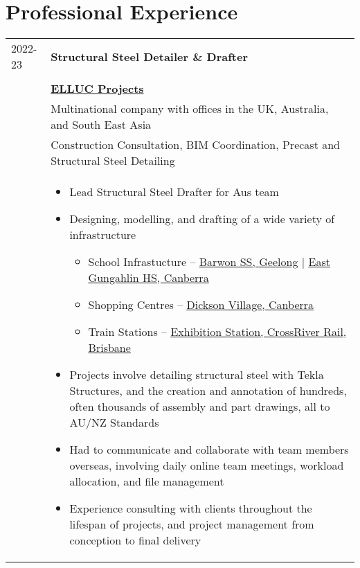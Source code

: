 \documentclass[10pt]{article}
\begin{document}
\section*{Professional Experience}
\begin{tabular}{ p{2cm}|p{15cm} }
    2022-23 & \huge\textbf{Structural Steel Detailer \& Drafter} \\ \\
    & \href{https://www.linkedin.com/company/ellucprojects/?originalSubdomain=uk}{\Large\textbf{ELLUC Projects}} \\
    & Multinational company with offices in the UK, Australia, and South East Asia \\
    & Construction Consultation, BIM Coordination, Precast and Structural Steel Detailing \\
    & \begin{itemize}
        \setlength\itemsep{0pt} 
        \item Lead Structural Steel Drafter for Aus team
        \item Designing, modelling, and drafting of a wide variety of infrastructure
        \begin{itemize}
            \item[\textbullet] School Infrastucture --
                \underline{\href{https://www.schoolbuildings.vic.gov.au/barwon-valley-school}{Barwon SS, Geelong}} $\vert$   
                \underline{\href{https://icon.co/projects/east-gungahlin-high-school/}{East Gungahlin HS, Canberra}}
            \item[\textbullet] Shopping Centres -- 
                \underline{\href{https://dicksonvillage.com.au}{Dickson Village, Canberra}}
            \item[\textbullet] Train Stations --
                \underline{\href{https://crossriverrail.qld.gov.au/stations-routes/exhibition-station/}{Exhibition Station, CrossRiver Rail, Brisbane}}
        \end{itemize}
        \item Projects involve detailing structural steel with Tekla Structures, and the creation and annotation of hundreds, often thousands of assembly and part drawings, all to AU/NZ Standards
        \item Had to communicate and collaborate with team members overseas, involving daily online team meetings, workload allocation, and file management
        \item Experience consulting with clients throughout the lifespan of projects, and project management from conception to final delivery
    \end{itemize}
\end{tabular}
\end{document}
